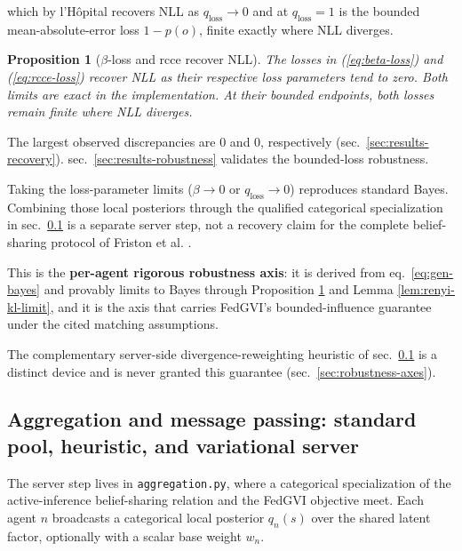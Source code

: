 \documentclass[
  english,
]{article}
\theoremstyle{plain}
\newtheorem{proposition}[theorem]{Proposition}
\theoremstyle{definition}
\theoremstyle{remark}
\theoremstyle{definition}
\begin{document}
which by l'Hôpital recovers NLL as \(q_{\text{loss}}\to 0\) and at
\(q_{\text{loss}}=1\) is the bounded mean-absolute-error loss
\(1 - p(o)\), finite exactly where NLL diverges.

\begin{proposition}[\(\beta\)-loss and rcce recover NLL]\label{prop:robust-loss-recovery}
The losses in (\ref{eq:beta-loss}) and (\ref{eq:rcce-loss}) recover NLL as
their respective loss parameters tend to zero. Both limits are exact in the
implementation. At their bounded endpoints, both losses remain finite where
NLL diverges.
\end{proposition}

The largest observed discrepancies are 0 and 0, respectively
(sec.~\ref{sec:results-recovery}). sec.~\ref{sec:results-robustness}
validates the bounded-loss robustness.

Taking the loss-parameter limits (\(\beta\to0\) or
\(q_{\text{loss}}\to0\)) reproduces standard Bayes. Combining those
local posteriors through the qualified categorical specialization in
sec.~\ref{sec:method-aggregation} is a separate server step, not a
recovery claim for the complete belief-sharing protocol of Friston et
al. \citeyearpar{friston2024federated}.

This is the \textbf{per-agent rigorous robustness axis}: it is derived
from eq.~\ref{eq:gen-bayes} and provably limits to Bayes through
Proposition \ref{prop:robust-loss-recovery} and Lemma
\ref{lem:renyi-kl-limit}, and it is the axis that carries FedGVI's
bounded-influence guarantee under the cited matching assumptions.

The complementary server-side divergence-reweighting heuristic of
sec.~\ref{sec:method-aggregation} is a distinct device and is never
granted this guarantee (sec.~\ref{sec:robustness-axes}).

\subsection{Aggregation and message passing: standard pool, heuristic,
and variational server}\label{sec:method-aggregation}

The server step lives in \texttt{aggregation.py}, where a categorical
specialization of the active-inference belief-sharing relation
\citep{friston2024federated} and the FedGVI objective
\citep{mildner2025fedgvi} meet. Each agent \(n\) broadcasts a
categorical local posterior \(q_n(s)\) over the shared latent factor,
optionally with a scalar base weight \(w_n\).
\end{document}
